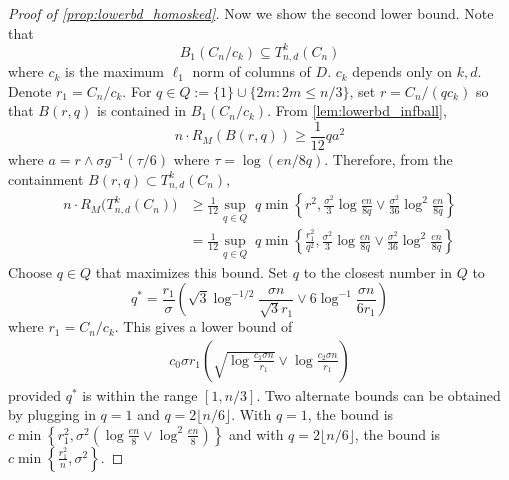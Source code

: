 \documentclass[ejs,noshowframe]{imsart}
\theoremstyle{plain}
\theoremstyle{definition}
\newcommand{\ktvset}{T}
\begin{document}
\begin{appendix}
\begin{proof}[Proof of \autoref{prop:lowerbd_homosked}]
Now we show the second lower bound.
Note that 
$$
	B_1(C_n/c_k) \subseteq \ktvset_{n,d}^k (C_n)
$$
where $c_k$ is the maximum $\ell_1$ norm of columns of $D.$ 
$c_k$ depends only on $k,d.$ 
Denote $r_1 = C_n / c_k.$
For $q\in Q := \{1\} \cup \{2m : 2m \leq n/3\} $, set $r=C_n/(q c_k)$ so that 
$B(r,q)$  is contained in 
$B_1(C_n/c_k)$.
From \autoref{lem:lowerbd_infball}, 
\begin{equation}
n \cdot R_M( B(r,q) ) \geq \frac{1}{12} q a^2
\end{equation}
where $a = r \wedge \sigma g^{-1}(\tau/6)$ where $\tau = \log (en/8q).$
Therefore, from the containment $B(r, q) \subset \ktvset_{n,d}^k (C_n),$
\begin{align}
n \cdot R_M \big( \ktvset_{n,d}^k (C_n)  \big) 
	&\geq \frac{1}{12} \sup_{q \in Q} \;q \min\left\{ r^2, 
\frac{\sigma^2}{3} \log \frac{en}{8q} \vee  \frac{\sigma^2}{36} \log^2 
\frac{en}{8q}
						\right\}\\
	&= \frac{1}{12} \sup_{q \in Q} \;q \min\left\{ \frac{r_1^2}{q^2}, 
\frac{\sigma^2}{3} \log \frac{en}{8q} \vee  \frac{\sigma^2}{36} \log^2 
\frac{en}{8q}
						\right\}
\end{align}
Choose $q\in Q$ that maximizes this bound. 
Set $q$ to the closest number in $Q$ to
\begin{equation}
q^* = \frac{r_1}{\sigma} \left( 
	\sqrt{3} \log^{-1/2} \frac{\sigma n}{\sqrt{3} r_1}  
	\vee 
	6 \log^{-1} \frac{\sigma n}{6 r_1}
	\right)
\end{equation}
where $r_1 = C_n / c_k$. This gives a lower bound of
\begin{align}
\label{eq:lb_part1}
c_0 \sigma r_1  \left( \sqrt{\log \frac{c_1\sigma n}{r_1}} \vee \log \frac{c_2 
\sigma n}{r_1} \right)
\end{align}
provided $q^*$ is within the range $[1, n/3]$. 
Two alternate bounds can be obtained by plugging in $q=1$ and $q=2\lfloor n/6 
\rfloor $. With $q=1$, the bound is
$c \min\left\{ r_1^2, \sigma^2 \left(\log \frac{en}{8} \vee  \log^2 
\frac{en}{8} \right)
						\right\}$
and with $q=2\lfloor n/6 \rfloor$, the bound is \\
$c\min\left\{ \frac{r_1^2}{n}, \sigma^2\right\}.$


\end{proof}
\end{appendix}
\end{document}
